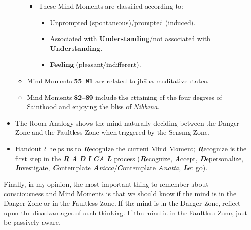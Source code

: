\begin{itemize}
\begin{itemize}
\begin{itemize}

\item These Mind Moments are classified according to:

\begin{itemize}

\item Unprompted (spontaneous)/prompted (induced).

\item Associated with \textbf{Understanding}/not associated with \textbf{Understanding}.

\item \textbf{Feeling} (pleasant/indifferent).

\end{itemize}

\end{itemize}

\item Mind Moments \textbf{55}--\textbf{81} are related to jhāna meditative states.

\item Mind Moments \textbf{82}--\textbf{89} include the attaining of the four degrees of Sainthood and enjoying the bliss of \textit{Nibbāna}.

\end{itemize}

\item The Room Analogy shows the mind naturally deciding between the Danger Zone and the Faultless Zone when triggered by the Sensing Zone.

\item Handout 2 helps us to \textbf{\textit{R}}ecognize the current Mind Moment; \textbf{\textit{R}}ecognize is the first step in the \textbf{\textit{R}} \textbf{\textit{A}} \textbf{\textit{D}} \textbf{\textit{I}} \textbf{\textit{CA}} \textbf{\textit{L}} process (\textbf{\textit{R}}ecognize, \textbf{\textit{A}}ccept, \textbf{\textit{D}}epersonalize, \textbf{\textit{I}}nvestigate, \textbf{\textit{C}}ontemplate \textbf{\textit{A}}\textit{nicca}/\textbf{\textit{C}}ontemplate \textbf{\textit{A}}\textit{nattā}, \textbf{\textit{L}}et go).

\end{itemize}

Finally, in my opinion, the most important thing to remember about consciousness and Mind Moments is that we should know if the mind is in the Danger Zone or in the Faultless Zone. If the mind is in the Danger Zone, reflect upon the disadvantages of such thinking. If the mind is in the Faultless Zone, just be passively aware.

